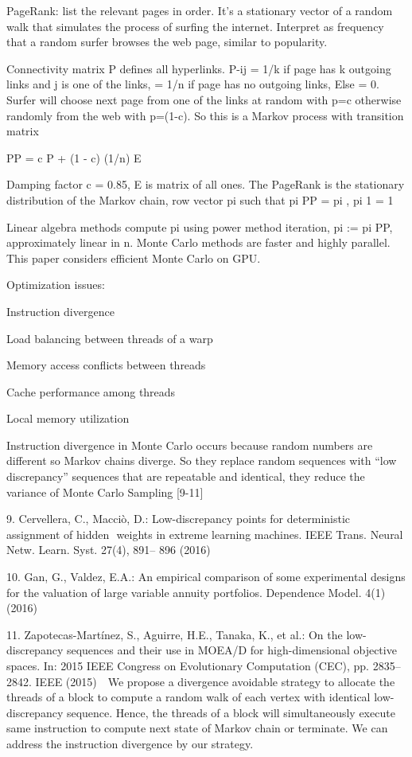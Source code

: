 \documentclass{article}
\begin{document}
PageRank: list the relevant pages in order.
It’s a stationary vector of a random walk that simulates the process of surfing the internet.
Interpret as frequency that a random surfer browses the web page, similar to popularity.

Connectivity matrix P defines all hyperlinks.
P-ij = 1/k if page has k outgoing links and j is one of the links,
 = 1/n if page has no outgoing links,
Else = 0.
Surfer will choose next page from one of the links at random with p=c otherwise randomly from the web with p=(1-c).
So this is a Markov process with transition matrix

PP = c P + (1 - c) (1/n) E

Damping factor c = 0.85,
E is matrix of all ones.
The PageRank is the stationary distribution of the Markov chain, row vector pi such that
pi PP = pi , pi 1 = 1

Linear algebra methods compute pi using power method iteration, pi := pi PP, approximately linear in n.
Monte Carlo methods are faster and highly parallel.
This paper considers efficient Monte Carlo on GPU.

Optimization issues:

Instruction divergence

Load balancing between threads of a warp

Memory access conflicts between threads

Cache performance among threads

Local memory utilization

Instruction divergence in Monte Carlo occurs because random numbers are different so Markov chains diverge.
So they replace random sequences with “low discrepancy” sequences that are repeatable and identical, they reduce the variance of Monte Carlo Sampling [9-11]

9. Cervellera, C., Macciò, D.: Low-discrepancy points for deterministic assignment of hidden  weights in extreme learning machines. IEEE Trans. Neural Netw. Learn. Syst. 27(4), 891– 896 (2016) 

	10.	Gan, G., Valdez, E.A.: An empirical comparison of some experimental designs for the valuation of large variable annuity portfolios. Dependence Model. 4(1) (2016) 

	11.	Zapotecas-Martínez, S., Aguirre, H.E., Tanaka, K., et al.: On the low-discrepancy sequences and their use in MOEA/D for high-dimensional objective spaces. In: 2015 IEEE Congress on Evolutionary Computation (CEC), pp. 2835–2842. IEEE (2015)  
We propose a divergence avoidable strategy to allocate the threads of a block to compute a random walk of each vertex with identical low-discrepancy sequence. Hence, the threads of a block will simultaneously execute same instruction to compute next state of Markov chain or terminate. We can address the instruction divergence by our strategy. 
\end{document}
